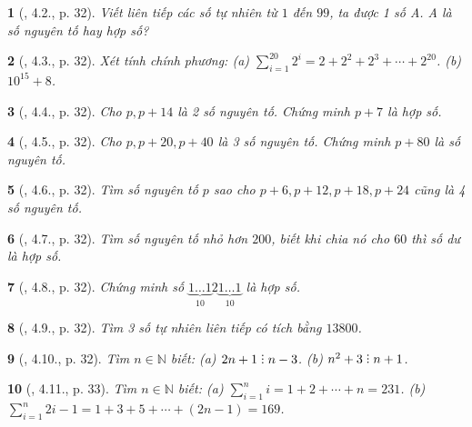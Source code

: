 \documentclass{article}
\newtheorem{baitoan}{}
\DeclareRobustCommand{\divby}{%
	\mathrel{\vbox{\baselineskip.65ex\lineskiplimit0pt\hbox{.}\hbox{.}\hbox{.}}}%
}
\begin{document}
\begin{baitoan}[\cite{TLCT_THCS_Toan_6_so_hoc}, 4.2., p. 32]
	Viết liên tiếp các số tự nhiên từ $1$ đến $99$, ta được 1 số A. A là số nguyên tố hay hợp số?
\end{baitoan}

\begin{baitoan}[\cite{TLCT_THCS_Toan_6_so_hoc}, 4.3., p. 32]
	Xét tính chính phương: (a) $\sum_{i=1}^{20} 2^i = 2 + 2^2 + 2^3 + \cdots + 2^{20}$. (b) $10^{15} + 8$.
\end{baitoan}

\begin{baitoan}[\cite{TLCT_THCS_Toan_6_so_hoc}, 4.4., p. 32]
	Cho $p,p + 14$ là 2 số nguyên tố. Chứng minh $p + 7$ là hợp số.
\end{baitoan}

\begin{baitoan}[\cite{TLCT_THCS_Toan_6_so_hoc}, 4.5., p. 32]
	Cho $p,p + 20,p + 40$ là 3 số nguyên tố. Chứng minh $p + 80$ là số nguyên tố.
\end{baitoan}

\begin{baitoan}[\cite{TLCT_THCS_Toan_6_so_hoc}, 4.6., p. 32]
	Tìm số nguyên tố $p$ sao cho $p + 6,p + 12,p + 18,p + 24$ cũng là 4 số nguyên tố.
\end{baitoan}

\begin{baitoan}[\cite{TLCT_THCS_Toan_6_so_hoc}, 4.7., p. 32]
	Tìm số nguyên tố nhỏ hơn $200$, biết khi chia nó cho $60$ thì số dư là hợp số.
\end{baitoan}

\begin{baitoan}[\cite{TLCT_THCS_Toan_6_so_hoc}, 4.8., p. 32]
	Chứng minh số $\underbrace{1\ldots1}_{10}2\underbrace{1\ldots1}_{10}$ là hợp số.
\end{baitoan}

\begin{baitoan}[\cite{TLCT_THCS_Toan_6_so_hoc}, 4.9., p. 32]
	Tìm 3 số tự nhiên liên tiếp có tích bằng $13800$.
\end{baitoan}

\begin{baitoan}[\cite{TLCT_THCS_Toan_6_so_hoc}, 4.10., p. 32]
	Tìm $n\in\mathbb{N}$ biết: (a) $2n + 1\divby n - 3$. (b) $n^2 + 3\divby n + 1$.
\end{baitoan}

\begin{baitoan}[\cite{TLCT_THCS_Toan_6_so_hoc}, 4.11., p. 33]
	Tìm $n\in\mathbb{N}$ biết: (a) $\sum_{i=1}^n i = 1 + 2 + \cdots + n = 231$. (b) $\sum_{i=1}^n 2i - 1 = 1 + 3 + 5 + \cdots + (2n - 1) = 169$.
\end{baitoan}
\end{document}
